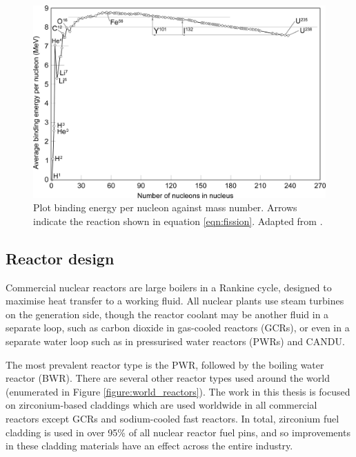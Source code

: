 \begin{figure}[ht]
\centering
\includegraphics[width=14cm]{images/Binding_energy_curve.png}
\caption[Plot binding energy per nucleon against mass number. Arrows indicate the reaction shown in equation \ref{eqn:fission}.]{Plot binding energy per nucleon against mass number. Arrows indicate the reaction shown in equation \ref{eqn:fission}. Adapted from \cite{Fastfission}.}
\label{figure:bindingenergy}
\end{figure}


\subsection{Reactor design} %

Commercial nuclear reactors are large boilers in a Rankine cycle, designed to maximise heat transfer to a working fluid. All nuclear plants use steam turbines on the generation side, though the reactor coolant may be another fluid in a separate loop, such as carbon dioxide in gas-cooled reactors (GCRs), or even in a separate water loop such as in pressurised water reactors (PWRs) and CANDU. 

The most prevalent reactor type is the PWR, followed by the boiling water reactor (BWR). There are several other reactor types used around the world (enumerated in Figure \ref{figure:world_reactors}). The work in this thesis is focused on zirconium-based claddings which are used worldwide in all commercial reactors except GCRs and sodium-cooled fast reactors. In total, zirconium fuel cladding is used in over 95\% of all nuclear reactor fuel pins, and so improvements in these cladding materials have an effect across the entire industry.

